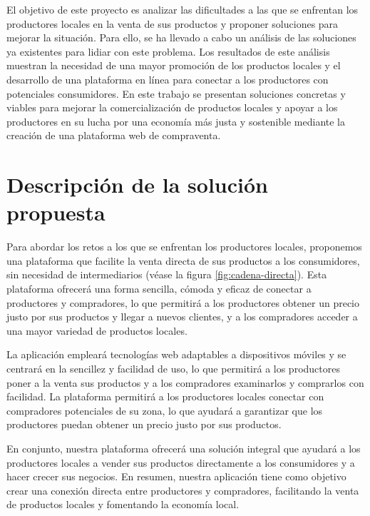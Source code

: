 
El objetivo de este proyecto es analizar las dificultades a las que se enfrentan los productores locales en la venta de sus productos y proponer soluciones para mejorar la situación. Para ello, se ha llevado a cabo un análisis de las soluciones ya existentes para lidiar con este problema. Los resultados de este análisis muestran la necesidad de una mayor promoción de los productos locales y el desarrollo de una plataforma en línea para conectar a los productores con  potenciales consumidores. En este trabajo se presentan soluciones concretas y viables para mejorar la comercialización de productos locales y apoyar a los productores en su lucha por una economía más justa y sostenible mediante la creación de una plataforma web de compraventa.

\section{Descripción de la solución propuesta}\label{sec:descripcion-solucion}

Para abordar los retos a los que se enfrentan los productores locales, proponemos una plataforma que facilite la venta directa de sus productos a los consumidores, sin necesidad de intermediarios (véase la figura \ref{fig:cadena-directa}). Esta plataforma ofrecerá una forma sencilla, cómoda y eficaz de conectar a productores y compradores, lo que permitirá a los productores obtener un precio justo por sus productos y llegar a nuevos clientes, y a los compradores acceder a una mayor variedad de productos locales. 


La aplicación empleará tecnologías web adaptables a dispositivos móviles y se centrará en la sencillez y facilidad de uso, lo que permitirá a los productores poner a la venta sus productos y a los compradores examinarlos y comprarlos con facilidad. La plataforma permitirá a los productores locales conectar con compradores potenciales de su zona, lo que ayudará a garantizar que los productores puedan obtener un precio justo por sus productos.

En conjunto, nuestra plataforma ofrecerá una solución integral que ayudará a los productores locales a vender sus productos directamente a los consumidores y a hacer crecer sus negocios. En resumen, nuestra aplicación tiene como objetivo crear una conexión directa entre productores y compradores, facilitando la venta de productos locales y fomentando la economía local.

